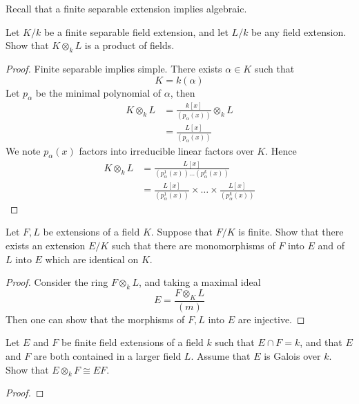 \begin{prop}
    Recall that a finite separable extension implies algebraic.
\end{prop}





\begin{prob}[S2017-Q3]
    Let \(K/k\) be a finite separable field extension, and let \(L/k\) be any field extension. Show that \(K\otimes_{k}L\) is a product of fields.
\end{prob}
\begin{proof}
    Finite separable implies simple. There exists $\alpha\in K$ such that 
    \begin{equation*}
        K=k(\alpha)
    \end{equation*}
    Let $p_\alpha$ be the minimal polynomial of $\alpha$, then
    \begin{align*}
        K\otimes_k L&=\frac{k[x]}{(p_\alpha(x))}\otimes_kL\\
        &=\frac{L[x]}{(p_\alpha(x))}
    \end{align*}
    We note $p_\alpha(x)$ factors into irreducible linear factors over $K$. Hence 
    \begin{align*}
        K\otimes_kL&=\frac{L[x]}{(p_\alpha^1(x))\dots(p_\alpha^k(x))}\\
        &=\frac{L[x]}{(p_\alpha^1(x))}\times\dots\times \frac{L[x]}{(p_\alpha^k(x))}
    \end{align*}
\end{proof}



\begin{prob}[F2019-Q3]
    Let \(F,L\) be extensions of a field \(K\). Suppose that \(F/K\) is finite. Show that there exists an extension \(E/K\) such that there are monomorphisms of \(F\) into \(E\) and of \(L\) into \(E\) which are identical on \(K\).
\end{prob}
\begin{proof}
    Consider the ring $F\otimes_kL$, and taking a maximal ideal 
    \begin{equation*}
        E=\frac{F\otimes_KL}{(m)}
    \end{equation*}
    Then one can show that the morphisms of $F,L$ into $E$ are injective.
\end{proof}


\begin{prob}[F2009-Q4]
    Let \(E\) and \(F\) be finite field extensions of a field \(k\) such that \(E \cap F = k\), and that \(E\) and \(F\) are both contained in a larger field \(L\). Assume that \(E\) is Galois over \(k\). Show that \(E \otimes_k F \cong EF\).
\end{prob}
\begin{proof}
    
\end{proof}



